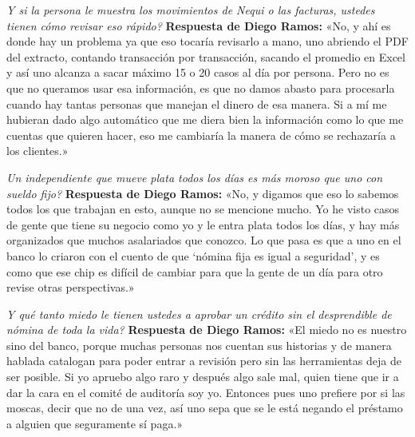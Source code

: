 \documentclass[11pt,a4paper]{article}
\begin{document}
\begin{tcolorbox}[colback=lightgray,colframe=primary,title={\textbf{Pregunta 2: Capacidad de revisar extractos a mano}}]
\textit{\textquestiondown Y si la persona le muestra los movimientos de Nequi o las facturas, ustedes tienen c\'omo revisar eso r\'apido?}
\tcblower
\textbf{Respuesta de Diego Ramos:}  
«No, y ah\'i es donde hay un problema ya que eso tocar\'ia revisarlo a mano, uno abriendo el PDF del extracto, contando transacci\'on por transacci\'on, sacando el promedio en Excel y as\'i uno alcanza a sacar m\'aximo 15 o 20 casos al d\'ia por persona. Pero no es que no queramos usar esa informaci\'on, es que no damos abasto para procesarla cuando hay tantas personas que manejan el dinero de esa manera. Si a m\'i me hubieran dado algo autom\'atico que me diera bien la informaci\'on como lo que me cuentas que quieren hacer, eso me cambiar\'ia la manera de c\'omo se rechazar\'ia a los clientes.»
\end{tcolorbox}

\begin{tcolorbox}[colback=lightgray,colframe=primary,title={\textbf{Pregunta 3: Comportamiento de pago de independientes vs. asalariados}}]
\textit{\textquestiondown Un independiente que mueve plata todos los d\'ias es m\'as moroso que uno con sueldo fijo?}
\tcblower
\textbf{Respuesta de Diego Ramos:}  
«No, y digamos que eso lo sabemos todos los que trabajan en esto, aunque no se mencione mucho. Yo he visto casos de gente que tiene su negocio como yo y le entra plata todos los d\'ias, y hay m\'as organizados que muchos asalariados que conozco. Lo que pasa es que a uno en el banco lo criaron con el cuento de que `n\'omina fija es igual a seguridad', y es como que ese chip es dif\'icil de cambiar para que la gente de un d\'ia para otro revise otras perspectivas.»
\end{tcolorbox}

\begin{tcolorbox}[colback=lightgray,colframe=primary,title={\textbf{Pregunta 4: Miedo a aprobar cr\'editos sin certificado laboral}}]
\textit{\textquestiondown Y qu\'e tanto miedo le tienen ustedes a aprobar un cr\'edito sin el desprendible de n\'omina de toda la vida?}
\tcblower
\textbf{Respuesta de Diego Ramos:}  
«El miedo no es nuestro sino del banco, porque muchas personas nos cuentan sus historias y de manera hablada catalogan para poder entrar a revisi\'on pero sin las herramientas deja de ser posible. Si yo apruebo algo raro y despu\'es algo sale mal, quien tiene que ir a dar la cara en el comit\'e de auditor\'ia soy yo. Entonces pues uno prefiere por si las moscas, decir que no de una vez, as\'i uno sepa que se le est\'a negando el pr\'estamo a alguien que seguramente s\'i paga.»
\end{tcolorbox}
\end{document}
